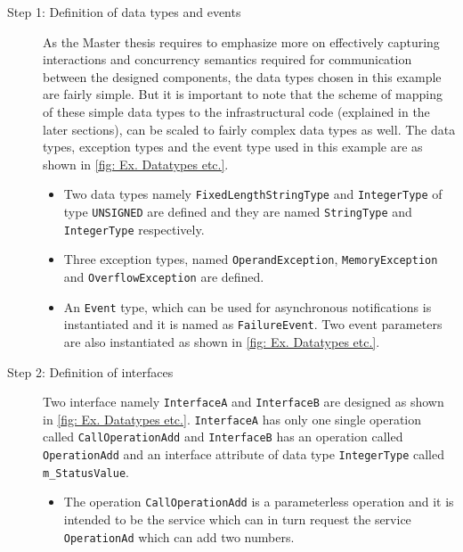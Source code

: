 \begin{description}
\item [Step 1: Definition of data types and events] As the Master thesis requires to emphasize more on effectively capturing interactions and concurrency semantics required for communication between the designed components, the data types chosen in this example are fairly simple. But it is important to note that the scheme of mapping of these simple data types to the infrastructural code (explained in the later sections), can be scaled to fairly complex data types as well. The data types, exception types and the event type used in this example are as shown in \cref{fig: Ex. Datatypes etc.}.  

\begin{itemize}
\item Two data types namely \texttt{Fixed\allowbreak Length\allowbreak String\allowbreak Type} and \texttt{Integer\allowbreak Type} of type \texttt{UNSIGNED} are defined and they are named \texttt{StringType} and \texttt{IntegerType} respectively.

\item Three exception types, named \texttt{OperandException}, \texttt{MemoryException} and \texttt{Overflow\allowbreak Exception} are defined. 

\item An \texttt{Event} type, which can be used for asynchronous notifications \cite{SpecMetamodel} is instantiated and it is named as \texttt{FailureEvent}. Two event parameters are also instantiated as shown in \cref{fig: Ex. Datatypes etc.}.

\end{itemize} 

\item [Step 2: Definition of interfaces] Two interface namely \texttt{InterfaceA} and \texttt{InterfaceB} are designed as shown in \cref{fig: Ex. Datatypes etc.}. \texttt{InterfaceA} has only one single operation called \texttt{CallOperationAdd} and \texttt{InterfaceB} has an operation called \texttt{OperationAdd} and an interface attribute of data type \texttt{IntegerType} called \texttt{m\_StatusValue}.  

\begin{itemize}
\item The operation \texttt{Call\allowbreak OperationAdd} is a parameterless operation and it is intended to be the service which can in turn request the service \texttt{OperationAd} which can add two numbers.


\end{itemize}
\end{description}
